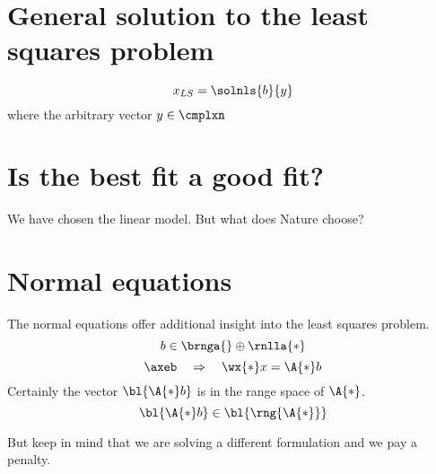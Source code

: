\section[General solution]{General solution to the least squares problem}  %

  \begin{equation}
    x_{LS} = \solnls{b}{y}
  \end{equation}
where the arbitrary vector $y\in\cmplxn$

\section[Is the best fit a good fit?]{Is the best fit a good fit?}  %
We have chosen the linear model. But what does Nature choose?



\section{Normal equations}  %
The normal equations offer additional insight into the least squares problem.
  \begin{equation*}
    b \in \brnga{} \oplus \rnlla{*}
  \end{equation*}
  \begin{equation}
    \axeb \quad \Rightarrow \quad \wx{*}x = \A{*}b
  \end{equation}
Certainly the vector $\bl{\A{*}b}$ is in the range space of $\A{*}$.
  \begin{equation*}
    \bl{\A{*}b} \in \bl{\rng{\A{*}}}
  \end{equation*}

But keep in mind that we are solving a different formulation and we pay a penalty.

